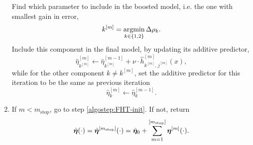 \begin{algorithm}
\begin{enumerate}
    \label{algostep:FHT-end}
        Find which parameter to include in the boosted model, i.e. the one with smallest gain in error,
        \begin{equation*}
            k^{[m]}=\operatorname*{argmin}_{k\in\{1,2\}}\Delta\rho_k.
        \end{equation*}
        Include this component in the final model, by updating its additive predictor,
        \begin{equation*}
            \hat{\eta}^{[m]}_{k^{[m]}}\gets\hat{\eta}^{[m-1]}_{k^{[m]}}+\nu\cdot\hat{h}^{[m]}_{k^{[m]},\,j^{[m]}}(x),
        \end{equation*}
        while for the other component $k\neq k^{[m]}$, set the additive predictor for this iteration to be the same as previous iteration
        \begin{equation*}
            \hat{\eta}^{[m]}_{k}\gets\hat{\eta}^{[m-1]}_{k}.
        \end{equation*}
    \item
        If $m<m_{\text{stop}}$, go to step \ref{algostep:FHT-init}.
        If not, return
        \begin{equation*}
            \hat{\boldsymbol{\eta}}(\cdot)=\hat{\boldsymbol{\eta}}^{[m_{\text{stop}}]}(\cdot)=\hat{\boldsymbol{\eta}}_0+\sum_{m=1}^{[m_{\text{stop}}]}\boldsymbol{\eta}^{[m]}(\cdot).
        \end{equation*}
\end{enumerate}
\end{algorithm}


